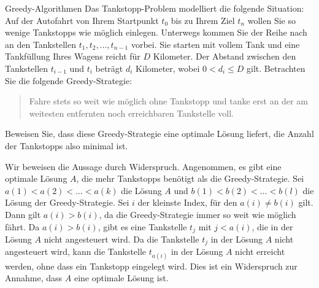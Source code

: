 \documentclass{article}
\begin{document}
\begin{exercise}{Greedy-Algorithmen}
  Das Tankstopp-Problem modelliert die folgende Situation: Auf der Autofahrt von Ihrem Startpunkt $t_0$ bis zu Ihrem Ziel $t_n$ wollen Sie so wenige Tankstopps wie möglich einlegen. Unterwegs kommen Sie der Reihe nach an den Tankstellen $t_1,t_2,...,t_{n-1}$ vorbei. Sie starten mit vollem Tank und eine Tankfüllung Ihres Wagens reicht für $D$ Kilometer. Der Abstand zwischen den Tankstellen $t_{i-1}$ und $t_i$ beträgt $d_i$ Kilometer, wobei $0 < d_i \leq D$ gilt. Betrachten Sie die folgende Greedy-Strategie:
  \begin{quote}
    Fahre stets so weit wie möglich ohne Tankstopp und tanke erst an der am weitesten entfernten noch erreichbaren Tankstelle voll.
  \end{quote}
  Beweisen Sie, dass diese Greedy-Strategie eine optimale Lösung liefert, die Anzahl der Tankstopps also minimal ist.

  \begin{solution}
    Wir beweisen die Aussage durch Widerspruch. Angenommen, es gibt eine optimale Lösung $A$, die mehr Tankstopps benötigt als die Greedy-Strategie. Sei $a(1) < a(2) < \dots < a(k)$ die Lösung $A$ und $b(1) < b(2) < \dots < b(l)$ die Lösung der Greedy-Strategie. Sei $i$ der kleinste Index, für den $a(i) \neq b(i)$ gilt. Dann gilt $a(i) > b(i)$, da die Greedy-Strategie immer so weit wie möglich fährt. Da $a(i) > b(i)$, gibt es eine Tankstelle $t_j$ mit $j < a(i)$, die in der Lösung $A$ nicht angesteuert wird. Da die Tankstelle $t_j$ in der Lösung $A$ nicht angesteuert wird, kann die Tankstelle $t_{a(i)}$ in der Lösung $A$ nicht erreicht werden, ohne dass ein Tankstopp eingelegt wird. Dies ist ein Widerspruch zur Annahme, dass $A$ eine optimale Lösung ist.
  \end{solution}
\end{exercise}
\end{document}
